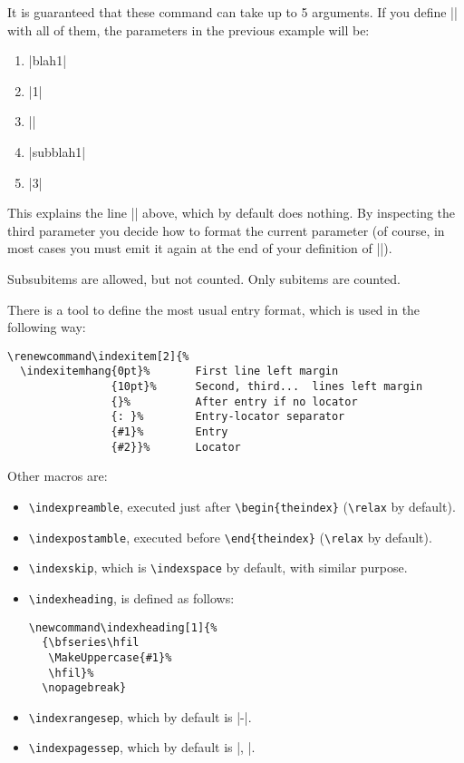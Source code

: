 \documentclass[a4paper]{ltxguide}
\begin{document}
It is guaranteed that these command can take up to 5 arguments. If you
define |\indexitem| with all of them, the parameters in the previous
example will be:
\begin{enumerate}
  \item |blah1|
  \item |1|
  \item |\indexsubitem|
  \item |subblah1|
  \item |3|
\end{enumerate}
This explains the line |\indexnoitem{}{}| above, which by default does
nothing. By inspecting the third parameter you decide how to format the
current parameter (of course, in most cases you must emit it again at
the end of your definition of |\indexitem|).

Subsubitems are allowed, but not counted. Only subitems are counted.


There is a tool to define the most usual entry format, which is used in
the following way:
\begin{verbatim}
\renewcommand\indexitem[2]{%
  \indexitemhang{0pt}%       First line left margin
                {10pt}%      Second, third...  lines left margin
                {}%          After entry if no locator
                {: }%        Entry-locator separator
                {#1}%        Entry
                {#2}}%       Locator
\end{verbatim}

Other macros are:
\begin{itemize}
\item \verb|\indexpreamble|, executed just after
  \verb|\begin{theindex}| (\verb|\relax| by default).
\item \verb|\indexpostamble|, executed before 
  \verb|\end{theindex}| (\verb|\relax| by default).
\item \verb|\indexskip|, which is \verb|\indexspace| by default, 
with similar purpose.
\item \verb|\indexheading|, is defined as follows:
\begin{verbatim}
\newcommand\indexheading[1]{%
  {\bfseries\hfil
   \MakeUppercase{#1}%
   \hfil}%
  \nopagebreak}
\end{verbatim}
\item \verb|\indexrangesep|, which by default is |-|.
\item \verb|\indexpagessep|, which by default is |, |.
\end{itemize}
\end{document}
